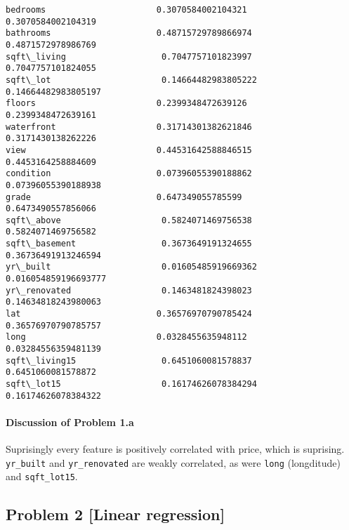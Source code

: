 \documentclass[11pt]{article}
\begin{document}
    \begin{Verbatim}[commandchars=\\\{\}]
bedrooms                      0.3070584002104321            0.3070584002104319            
bathrooms                     0.48715729789866974           0.4871572978986769            
sqft\_living                   0.7047757101823997            0.7047757101824055            
sqft\_lot                      0.14664482983805222           0.14664482983805197           
floors                        0.2399348472639126            0.2399348472639161            
waterfront                    0.31714301382621846           0.3171430138262226            
view                          0.44531642588846515           0.4453164258884609            
condition                     0.07396055390188862           0.07396055390188938           
grade                         0.647349055785599             0.6473490557856066            
sqft\_above                    0.5824071469756538            0.5824071469756582            
sqft\_basement                 0.3673649191324655            0.36736491913246594           
yr\_built                      0.01605485919669362           0.016054859196693777          
yr\_renovated                  0.1463481824398023            0.14634818243980063           
lat                           0.36576970790785424           0.36576970790785757           
long                          0.0328455635948112            0.03284556359481139           
sqft\_living15                 0.6451060081578837            0.6451060081578872            
sqft\_lot15                    0.16174626078384294           0.16174626078384322           

    \end{Verbatim}

    \paragraph{Discussion of Problem 1.a}\label{discussion-of-problem-1.a}

Suprisingly every feature is positively correlated with price, which is
suprising. \texttt{yr\_built} and \texttt{yr\_renovated} are weakly
correlated, as were \texttt{long} (longditude) and \texttt{sqft\_lot15}.

\subsection{Problem 2 {[}Linear
regression{]}}\label{problem-2-linear-regression}
\end{document}
